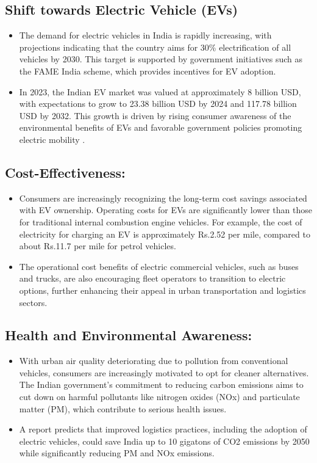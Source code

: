 \documentclass[a4paper,12pt]{report}
\begin{document}
\subsection{Shift towards Electric Vehicle (EVs)}
\begin{itemize}
    \item The demand for electric vehicles in India is rapidly increasing, with projections indicating that the country aims for 30\% electrification of all vehicles by 2030. This target is supported by government initiatives such as the FAME India scheme, which provides incentives for EV adoption.
    \item In 2023, the Indian EV market was valued at approximately 8 billion USD, with expectations to grow to 23.38 billion USD by 2024 and 117.78 billion USD by 2032. This growth is driven by rising consumer awareness of the environmental benefits of EVs and favorable government policies promoting electric mobility .
\end{itemize}

\subsection{Cost-Effectiveness:}
\begin{itemize}
    \item Consumers are increasingly recognizing the long-term cost savings associated with EV ownership. Operating costs for EVs are significantly lower than those for traditional internal combustion engine vehicles. For example, the cost of electricity for charging an EV is approximately Rs.2.52 per mile, compared to about Rs.11.7 per mile for petrol vehicles. 
    \item The operational cost benefits of electric commercial vehicles, such as buses and trucks, are also encouraging fleet operators to transition to electric options, further enhancing their appeal in urban transportation and logistics sectors.
\end{itemize}

\subsection{Health and Environmental Awareness:}
\begin{itemize}
    \item With urban air quality deteriorating due to pollution from conventional vehicles, consumers are increasingly motivated to opt for cleaner alternatives. The Indian government’s commitment to reducing carbon emissions aims to cut down on harmful pollutants like nitrogen oxides (NOx) and particulate matter (PM), which contribute to serious health issues.
    \item A report predicts that improved logistics practices, including the adoption of electric vehicles, could save India up to 10 gigatons of CO2 emissions by 2050 while significantly reducing PM and NOx emissions.
\end{itemize}
\end{document}
